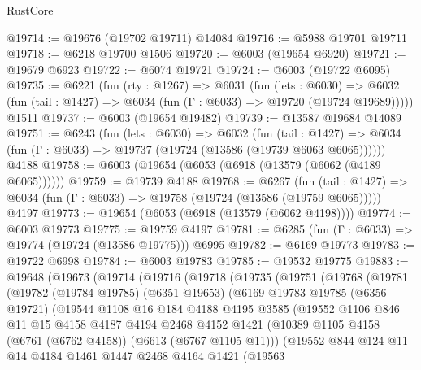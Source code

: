 \begin{lexlean}{RustCore}
\begin{coremodule}
@19714 := @19676 (@19702 @19711) @14084
@19716 := @5988 @19701 @19711
@19718 := @6218 @19700 @1506
@19720 := @6003 (@19654 @6920)
@19721 := @19679 @6923
@19722 := @6074 @19721
@19724 := @6003 (@19722 @6095)
@19735 := @6221
    (fun (rty : @1267) =>
    @6031
      (fun (lets : @6030) =>
      @6032 (fun (tail : @1427) => @6034 (fun (Γ : @6033) => @19720 (@19724 @19689)))))
    @1511
@19737 := @6003 (@19654 @19482)
@19739 := @13587 @19684 @14089
@19751 := @6243
    (fun (lets : @6030) =>
    @6032
      (fun (tail : @1427) =>
      @6034 (fun (Γ : @6033) => @19737 (@19724 (@13586 (@19739 @6063 @6065))))))
    @4188
@19758 := @6003 (@19654 (@6053 (@6918 (@13579 (@6062 (@4189 @6065))))))
@19759 := @19739 @4188
@19768 := @6267
    (fun (tail : @1427) => @6034 (fun (Γ : @6033) => @19758 (@19724 (@13586 (@19759 @6065)))))
    @4197
@19773 := @19654 (@6053 (@6918 (@13579 (@6062 @4198))))
@19774 := @6003 @19773
@19775 := @19759 @4197
@19781 := @6285 (fun (Γ : @6033) => @19774 (@19724 (@13586 @19775))) @6995
@19782 := @6169 @19773
@19783 := @19722 @6998
@19784 := @6003 @19783
@19785 := @19532 @19775
@19883 := @19648
    (@19673
      (@19714
        (@19716
          (@19718
            (@19735
              (@19751
                (@19768
                  (@19781
                    (@19782
                      (@19784 @19785)
                      (@6351 @19653)
                      (@6169
                        @19783
                        @19785
                        (@6356 @19721)
                        (@19544
                          @1108
                          @16
                          @184
                          @4188
                          @4195
                          @3585
                          (@19552
                            @1106
                            @846
                            @11
                            @15
                            @4158
                            @4187
                            @4194
                            @2468
                            @4152
                            @1421
                            (@10389 @1105 @4158 (@6761 (@6762 @4158)) (@6613 (@6767 @1105 @11)))
                            (@19552
                              @844
                              @124
                              @11
                              @14
                              @4184
                              @1461
                              @1447
                              @2468
                              @4164
                              @1421
                              (@19563

\end{coremodule}
\end{lexlean}
